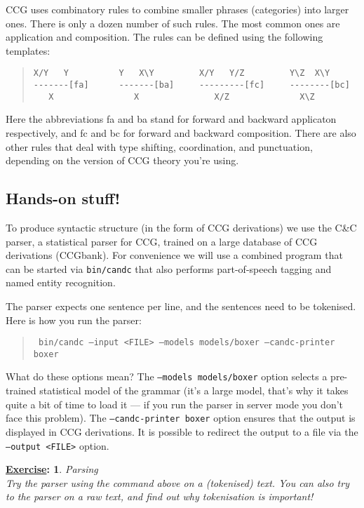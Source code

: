 \documentclass[11pt]{article}
\newtheorem{exercisebb}{\textbf{\underline{Exercise}:}}[section]
\newcommand{\bx}[1]{\begin{exercisebb} \rm #1\\}
\newcommand{\ex}{\end{exercisebb}}
\begin{document}
CCG uses combinatory rules to combine smaller phrases (categories)
into larger ones. There is only a dozen number of such rules. The most
common ones are application and composition. The rules can be defined
using the following templates:

\begin{quote}
\begin{verbatim}
X/Y   Y          Y   X\Y         X/Y   Y/Z         Y\Z  X\Y
-------[fa]      -------[ba]     ---------[fc]     --------[bc]
   X                X               X/Z              X\Z
\end{verbatim}
\end{quote}

Here the abbreviations fa and ba stand for forward and backward
applicaton respectively, and fc and bc for forward and backward
composition. There are also other rules that deal with type shifting,
coordination, and punctuation, depending on the version of CCG theory
you're using.


\subsection*{Hands-on stuff!}

To produce syntactic structure (in the form of CCG derivations) we use
the C\&C parser, a statistical parser for CCG, trained on a large
database of CCG derivations (CCGbank). For convenience we will use a
combined program that can be started via \texttt{bin/candc} that also
performs part-of-speech tagging and named entity recognition. 

The parser expects one sentence per line, and the sentences need to be tokenised. 
Here is how you run the parser:

\begin{quote}\tt
bin/candc --input <FILE> --models models/boxer --candc-printer boxer
\end{quote}

What do these options mean?  The \texttt{--models
models/boxer} option selects a pre-trained statistical model of the
grammar (it's a large model, that's why it takes quite a bit of time
to load it --- if you run the parser in server mode you don't face
this problem).  The \texttt{--candc-printer boxer} option ensures that
the output is displayed in CCG derivations. It is possible to redirect
the output to a file via the \texttt{--output <FILE>} option.

\bx{Parsing}
Try the parser using the command above on a (tokenised) text. You can
also try to the parser on a raw text, and find out why tokenisation is 
important!
\ex
\end{document}

